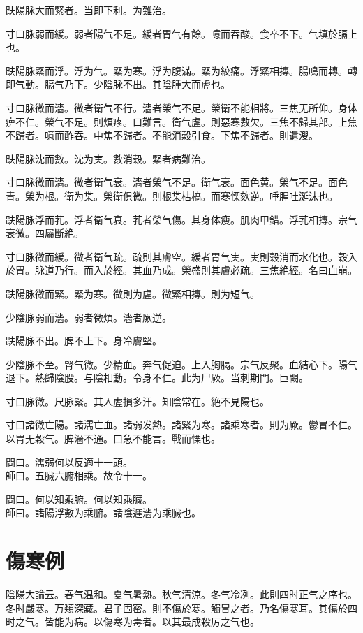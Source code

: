 \documentclass[12pt,twoside,UTF8,b5paper]{ctexbook}
\begin{document}
趺陽脉大而緊者。当即下利。为難治。

寸口脉弱而緩。弱者陽气不足。緩者胃气有餘。噫而吞酸。食卒不下。气填於膈上也。

趺陽脉緊而浮。浮为气。緊为寒。浮为腹滿。緊为絞痛。浮緊相摶。腸鳴而轉。轉即气動。膈气乃下。少陰脉不出。其陰腫大而虗也。

寸口脉微而濇。微者衛气不行。濇者榮气不足。榮衛不能相將。三焦无所仰。身体痹不仁。榮气不足。則煩疼。口難言。衛气虗。則惡寒數欠。三焦不歸其部。上焦不歸者。噫而酢吞。中焦不歸者。不能消穀引食。下焦不歸者。則遺溲。

趺陽脉沈而數。沈为実。數消穀。緊者病難治。

寸口脉微而濇。微者衛气衰。濇者榮气不足。衛气衰。面色黄。榮气不足。面色青。榮为根。衛为枼。榮衛俱微。則根枼枯槁。而寒慄欬逆。唾腥吐涎沫也。

趺陽脉浮而芤。浮者衛气衰。芤者榮气傷。其身体瘦。肌肉甲錯。浮芤相摶。宗气衰微。四屬斷絶。

寸口脉微而緩。微者衛气疏。疏則其膚空。緩者胃气実。実則穀消而水化也。穀入於胃。脉道乃行。而入於經。其血乃成。榮盛則其膚必疏。三焦絶經。名曰血崩。

趺陽脉微而緊。緊为寒。微則为虗。微緊相摶。則为短气。

少陰脉弱而濇。弱者微煩。濇者厥逆。

趺陽脉不出。脾不上下。身冷膚堅。

少陰脉不至。腎气微。少精血。奔气促迫。上入胸膈。宗气反聚。血結心下。陽气退下。熱歸陰股。与陰相動。令身不仁。此为尸厥。当刺期門。巨闕。

寸口脉微。尺脉緊。其人虗損多汗。知陰常在。絶不見陽也。

寸口諸微亡陽。諸濡亡血。諸弱发熱。諸緊为寒。諸乘寒者。則为厥。鬱冒不仁。以胃无穀气。脾濇不通。口急不能言。戰而慄也。

問曰。濡弱何以反適十一頭。\\
師曰。五臓六腑相乘。故令十一。

問曰。何以知乘腑。何以知乘臓。\\
師曰。諸陽浮數为乘腑。諸陰遲濇为乘臓也。

\chapter{傷寒例}

陰陽大論云。春气温和。夏气暑熱。秋气清涼。冬气冷冽。此則四时正气之序也。冬时嚴寒。万類深藏。君子固密。則不傷於寒。觸冒之者。乃名傷寒耳。其傷於四时之气。皆能为病。以傷寒为毒者。以其最成殺厉之气也。
\end{document}
